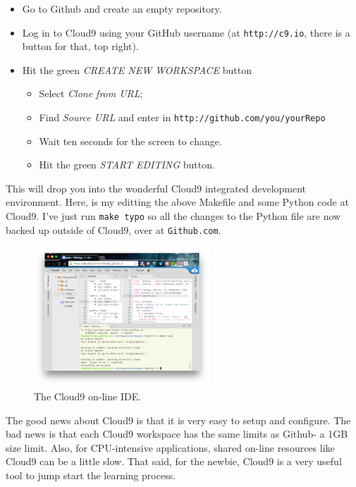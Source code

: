 \begin{itemize}
\itemsep1pt\parskip0pt
\item
  Go to Github and create an empty repository.
\item
  Log in to Cloud9 using your GitHub username (at \texttt{http://c9.io},
  there is a button for that, top right).
\item
  Hit the green \emph{CREATE NEW WORKSPACE} button

  \begin{itemize}
  \itemsep1pt\parskip0pt
  \item
    Select \emph{Clone from URL};
  \item
    Find \emph{Source URL} and enter in
    \texttt{http://github.com/you/yourRepo}
  \item
    Wait ten seconds for the screen to change.
  \item
    Hit the green \emph{START EDITING} button.
  \end{itemize}
\end{itemize}

This will drop you into the wonderful Cloud9 integrated development
environment. Here, is my editting the above Makefile and some Python
code at Cloud9. I've just run \texttt{make\ typo} so all the changes to
the Python file are now backed up outside of Cloud9, over at
\texttt{Github.com}.

\begin{figure}[htbp]
\centering
\includegraphics{img/c9400.png}
\caption{The Cloud9 on-line IDE.}
\end{figure}

The good news about Cloud9 is that it is very easy to setup and
configure. The bad news is that each Cloud9 workspace has the same
limits as Github- a 1GB size limit. Also, for CPU-intensive
applications, shared on-line resources like Cloud9 can be a little slow.
That said, for the newbie, Cloud9 is a very useful tool to jump start
the learning process.

